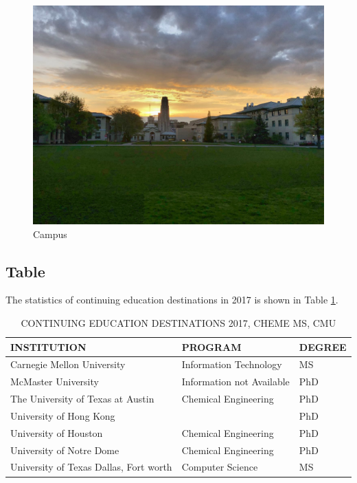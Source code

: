 \documentclass[12pt]{article}
\begin{document}
\begin{figure}[!h]
    \centering
    \includegraphics[scale = 0.2]{campus}
    \caption{Campus}
    \label{fig:campus}
\end{figure}

\subsection{Table}

The statistics of continuing education destinations in 2017 is shown in Table \ref{tab:education}.

\begin{table}[htbp]
  \centering
  \caption{CONTINUING EDUCATION DESTINATIONS 2017, CHEME MS, CMU}
    \begin{tabular}{lll}
    \toprule
    INSTITUTION & PROGRAM & DEGREE \\
    \midrule
    Carnegie Mellon University & Information Technology & MS \\
    McMaster University & Information not Available & PhD \\
    The University of Texas at Austin & Chemical Engineering & PhD \\
    University of Hong Kong &       & PhD \\
    University of Houston & Chemical Engineering & PhD \\
    University of Notre Dome & Chemical Engineering & PhD \\
    University of Texas Dallas, Fort worth & Computer Science & MS \\
    \bottomrule
    \end{tabular}%
  \label{tab:education}%
\end{table}%



\clearpage


\end{document}
